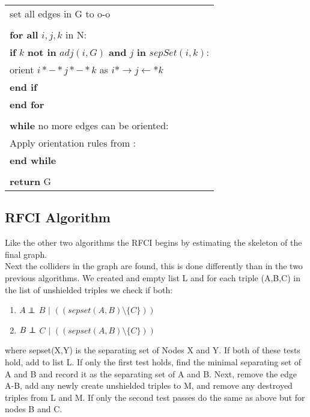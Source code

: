 \documentclass{article}
\newcommand\independent{\protect\mathpalette{\protect\independenT}{\perp}}
\def\independenT#1#2{\mathrel{\rlap{$#1#2$}\mkern2mu{#1#2}}}
\begin{document}
\begin{longtable}{|l l|}
		\multicolumn{2}{|l|}{set all edges in G to o-o}\\
		&\\
		\multicolumn{2}{|l|}{\textbf{for all} $ i,j,k $ in N:}\\
		\multicolumn{2}{|l|}{\quad\textbf{if} $ k $ \textbf{not in} $ adj(i,G) $ \textbf{and} $ j $ \textbf{in} $sepSet( i,k)$:}\\
		\multicolumn{2}{|l|}{\quad\quad orient $ i*-*j*-*k $ as $ i*\rightarrow j \leftarrow *k $ }\\
		\multicolumn{2}{|l|}{\quad\textbf{end if}}\\
		\multicolumn{2}{|l|}{\textbf{end for}}\\
		&\\
		
		\multicolumn{2}{|l|}{\textbf{while} no more edges can be oriented:}\\
		\multicolumn{2}{|l|}{\quad Apply orientation rules from \cite{ZHANG20081873}:}\\
		\multicolumn{2}{|l|}{\textbf{end while}}\\
		&\\
		\multicolumn{2}{|l|}{\textbf{return} G}\\
		\hline 
	\end{longtable}

\subsection{RFCI Algorithm}
Like the other two algorithms the RFCI begins by estimating the skeleton of the final graph.
\\

Next the colliders in the graph are found, this is done differently than in the two previous algorithms. We created and empty list L and for each triple (A,B,C) in the list of unshielded triples we check if both:
\\

\begin{enumerate}[i]
	\item $A \independent$ $B$ $|$ $((sepset(A,B) \setminus \{C\}))$
	\item $B \independent$ $C$ $|$ $((sepset(A,B) \setminus \{C\}))$\end{enumerate}
where sepset(X,Y) is the separating set of Nodes X and Y. If both of these tests hold, add to list L. If only the first test holds, find the minimal separating set of A and B and record it as the separating set of A and B. Next, remove the edge A-B, add any newly create unshielded triples to M, and remove any destroyed triples from L and M. If only the second test passes do the same as above but for nodes B and C.
\\
\end{document}
